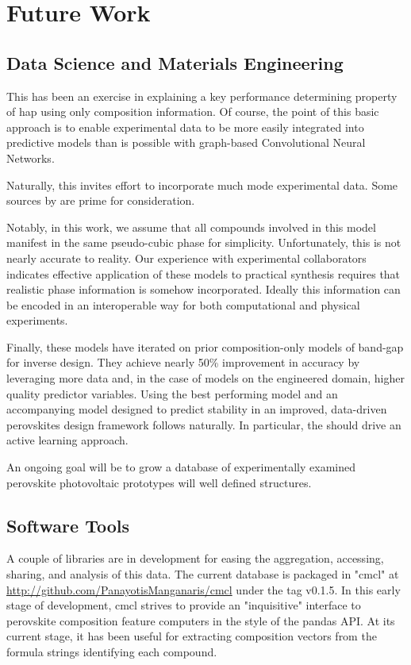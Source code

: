 \documentclass[aip, jmp, amsmath, amssymb]{revtex4-2}
\begin{document}
\section*{Future Work}
\label{sec:orgbc42280}
\subsection*{Data Science and Materials Engineering}
\label{sec:orgd49f725}
This has been an exercise in explaining a key performance determining
property of \Acrfull{hap} using only composition
information. Of course, the point of this basic approach is to enable
experimental data to be more easily integrated into predictive models
than is possible with graph-based Convolutional Neural Networks.

Naturally, this invites effort to incorporate much mode experimental
data. Some sources by
\citet{jacobsson-2021-open-acces,briones-2021-accel-lattic} are prime
for consideration.

Notably, in this work, we assume that all compounds involved in this
model manifest in the same pseudo-cubic phase for
simplicity. Unfortunately, this is not nearly accurate to reality. Our
experience with experimental collaborators indicates effective
application of these models to practical synthesis requires that
realistic phase information is somehow incorporated. Ideally this
information can be encoded in an interoperable way for both
computational and physical experiments.

Finally, these models have iterated on prior composition-only models
of band-gap for inverse
design\cite{mannodi-kanakkithodi-2022-data-driven}. They achieve nearly
50\% improvement in accuracy by leveraging more data and, in the case
of models on the engineered domain, higher quality predictor
variables. Using the best performing model and an accompanying model
designed to predict stability in an improved, data-driven perovskites
design framework follows naturally.  In particular, the  should
drive an active learning approach.

An ongoing goal will be to grow a database of experimentally examined
perovskite photovoltaic prototypes will well defined structures.

\subsection*{Software Tools}
\label{sec:orga100d44}
A couple of libraries are in development for easing the aggregation,
accessing, sharing, and analysis of this data. The current database is
packaged in "cmcl" at \url{http://github.com/PanayotisManganaris/cmcl} under
the tag v0.1.5. In this early stage of development, cmcl strives to
provide an "inquisitive" interface to perovskite composition feature
computers in the style of the pandas API. At its current stage, it has
been useful for extracting composition vectors from the formula
strings identifying each compound.
\end{document}
